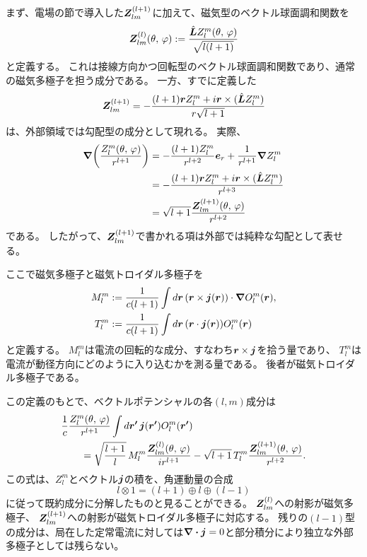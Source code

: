 \documentclass[../master.tex]{subfiles}
\begin{document}
まず、電場の節で導入した\(\vb*{Z}_{lm}^{(l+1)}\)に加えて、磁気型のベクトル球面調和関数を
\begin{equation}
    \vb*{Z}_{lm}^{(l)}(\theta,\,\varphi)
    :=\frac{\hat{\vb*{L}}Z_l^m(\theta,\,\varphi)}{\sqrt{l(l+1)}}
\end{equation}
と定義する。
これは接線方向かつ回転型のベクトル球面調和関数であり、通常の磁気多極子を担う成分である。
一方、すでに定義した
\begin{equation}
    \vb*{Z}_{lm}^{(l+1)}
    =-\frac{(l+1)\vb*{r}Z_l^m+i\vb*{r}\times(\hat{\vb*{L}}Z_l^m)}{r\sqrt{l+1}}
\end{equation}
は、外部領域では勾配型の成分として現れる。
実際、
\begin{equation}\begin{aligned}[b]
    \grad\qty(\frac{Z_l^m(\theta,\,\varphi)}{r^{l+1}})
    &= -\frac{(l+1)Z_l^m}{r^{l+2}}\vb*{e}_r
    +\frac{1}{r^{l+1}}\grad Z_l^m\\
    &= -\frac{(l+1)\vb*{r}Z_l^m+i\vb*{r}\times(\hat{\vb*{L}}Z_l^m)}{r^{l+3}}\\
    &= \sqrt{l+1}\frac{\vb*{Z}_{lm}^{(l+1)}(\theta,\,\varphi)}{r^{l+2}}
\end{aligned}\end{equation}
である。
したがって、\(\vb*{Z}_{lm}^{(l+1)}\)で書かれる項は外部では純粋な勾配として表せる。

ここで磁気多極子と磁気トロイダル多極子を
\begin{align}
    M_l^m
    &:=\frac{1}{c(l+1)}\int d\vb*{r}\,
    \qty(\vb*{r}\times\vb*{j}(\vb*{r}))\cdot\grad O_l^m(\vb*{r}),\\
    T_l^m
    &:=\frac{1}{c(l+1)}\int d\vb*{r}\,
    \qty(\vb*{r}\cdot\vb*{j}(\vb*{r}))O_l^m(\vb*{r})
\end{align}
と定義する。
\(M_l^m\)は電流の回転的な成分、すなわち\(\vb*{r}\times\vb*{j}\)を拾う量であり、
\(T_l^m\)は電流が動径方向にどのように入り込むかを測る量である。
後者が磁気トロイダル多極子である。

この定義のもとで、ベクトルポテンシャルの各\((l,m)\)成分は
\begin{equation}\begin{aligned}[b]
    &\frac{1}{c}\frac{Z_l^m(\theta,\,\varphi)}{r^{l+1}}
    \int d\vb*{r'}\,\vb*{j}(\vb*{r'})O_l^m(\vb*{r'})\\
    &\qquad =
    \sqrt{\frac{l+1}{l}}\,
    M_l^m\frac{\vb*{Z}_{lm}^{(l)}(\theta,\,\varphi)}{ir^{l+1}}
    -\sqrt{l+1}\,
    T_l^m\frac{\vb*{Z}_{lm}^{(l+1)}(\theta,\,\varphi)}{r^{l+2}}.
\end{aligned}\end{equation}
この式は、\(Z_l^m\)とベクトル\(\vb*{j}\)の積を、角運動量の合成
\begin{equation}
    l\otimes 1=(l+1)\oplus l\oplus(l-1)
\end{equation}
に従って既約成分に分解したものと見ることができる。
\(\vb*{Z}_{lm}^{(l)}\)への射影が磁気多極子、
\(\vb*{Z}_{lm}^{(l+1)}\)への射影が磁気トロイダル多極子に対応する。
残りの\((l-1)\)型の成分は、局在した定常電流に対しては\(\div\vb*{j}=0\)と部分積分により独立な外部多極子としては残らない。
\end{document}
